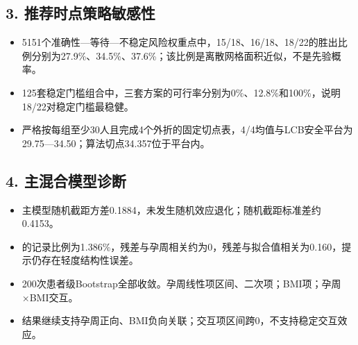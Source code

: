 \documentclass[UTF8,12pt,a4paper]{ctexart}
\begin{document}
\subsection{3. 推荐时点策略敏感性}
\begin{itemize}
\item 5151个准确性—等待—不稳定风险权重点中，15/18、16/18、18/22的胜出比例分别为27.9\%、34.5\%、37.6\%；该比例是离散网格面积近似，不是先验概率。
\item 125套稳定门槛组合中，三套方案的可行率分别为0\%、12.8\%和100\%，说明18/22对稳定门槛最稳健。
\item 严格按每组至少30人且完成4个外折的固定切点表，4/4均值与LCB安全平台为29.75—34.50；算法切点34.357位于平台内。
\end{itemize}

\subsection{4. 主混合模型诊断}
\begin{itemize}
\item 主模型随机截距方差0.1884，未发生随机效应退化；随机截距标准差约0.4153。
\item \textsf{}的记录比例为1.386\%，残差与孕周相关约为0，残差与拟合值相关为0.160，提示仍存在轻度结构性误差。
\item 200次患者级Bootstrap全部收敛。孕周线性项区间\textsf{\seqsplit{[0.1357,0.1945]}}、二次项\textsf{\seqsplit{[0.0236,0.0608]}}；BMI项\textsf{\seqsplit{[-0.1292,-0.00054]}}；孕周×BMI交互\textsf{\seqsplit{[-0.02195,0.02899]}}。
\item 结果继续支持孕周正向、BMI负向关联；交互项区间跨0，不支持稳定交互效应。
\end{itemize}
\end{document}
